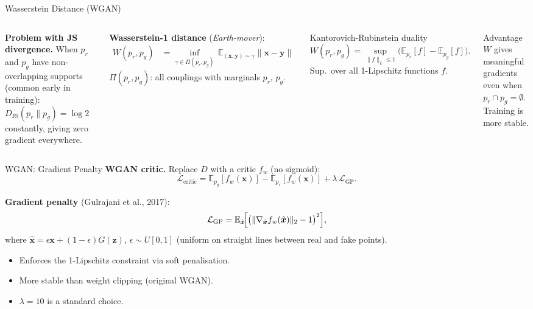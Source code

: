 \documentclass[aspectratio=169,11pt]{beamer}
\newcommand{\E}{\mathbb{E}}
\newcommand{\bx}{\bm{x}}
\newcommand{\bz}{\bm{z}}
\newcommand{\pr}{p_{r}}           %
\newcommand{\pg}{p_{g}}           %
\newcommand{\JS}{D_{\mathrm{JS}}} %
\begin{document}
\begin{frame}{Wasserstein Distance (WGAN)}
  \begin{columns}[T]
      \small
      \textbf{Problem with JS divergence.}
      When $\pr$ and $\pg$ have non-overlapping supports
      (common early in training): $\JS(\pr\|\pg)=\log 2$ constantly,
      giving zero gradient everywhere.

      \smallskip
      \textbf{Wasserstein-1 distance} (\emph{Earth-mover}):
      \begin{align*}
        W(\pr,\pg) &= \inf_{\gamma\in\Pi(\pr,\pg)}\,
          \E_{(\bx,\mathbf{y})\sim\gamma}\|\bx-\mathbf{y}\|
      \end{align*}
      $\Pi(\pr,\pg)$: all couplings with marginals $\pr$, $\pg$.

      \begin{block}{Kantorovich-Rubinstein duality}
        \[
          W(\pr,\pg) = \sup_{\|f\|_L\le 1}
          \bigl(\E_{\pr}[f] - \E_{\pg}[f]\bigr).
        \]
        Sup.\ over all 1-Lipschitz functions $f$.
      \end{block}
      \begin{alertblock}{Advantage}
        $W$ gives meaningful gradients
        even when $\pr\cap\pg=\emptyset$.
        Training is more stable.
      \end{alertblock}
  \end{columns}
\end{frame}

\begin{frame}{WGAN: Gradient Penalty}
  \textbf{WGAN critic.} Replace $D$ with a critic $f_w$ (no sigmoid):
  \[
    \mathcal{L}_{\mathrm{critic}}
    = \E_{\pg}[f_w(\bx)] - \E_{\pr}[f_w(\bx)]
    + \lambda\,\mathcal{L}_{\mathrm{GP}}.
  \]

  \textbf{Gradient penalty} (Gulrajani et al., 2017):
  \[
    \mathcal{L}_{\mathrm{GP}}
    = \E_{\hat{\bx}}\!\Bigl[
        \bigl(\|\nabla_{\hat{\bx}} f_w(\hat{\bx})\|_2 - 1\bigr)^2
      \Bigr],
  \]
  where $\hat{\bx} = \epsilon\bx + (1-\epsilon)G(\bz)$, $\epsilon\sim U[0,1]$
  (uniform on straight lines between real and fake points).

  \medskip
  \begin{itemize}
    \item Enforces the 1-Lipschitz constraint via soft penalisation.
    \item More stable than weight clipping (original WGAN).
    \item $\lambda=10$ is a standard choice.
  \end{itemize}
\end{frame}
\end{document}

